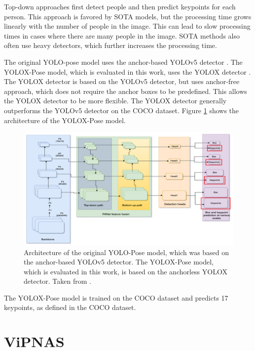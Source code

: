 Top-down approaches first detect people and then predict keypoints for each person. This approach is favored by SOTA models, but the processing time grows linearly with the number of people in the image. This can lead to slow processing times in cases where there are many people in the image. SOTA methods also often use heavy detectors, which further increases the processing time.



The original YOLO-pose \cite{yoloPose} model uses the anchor-based YOLOv5 detector \cite{yolov5}. The YOLOX-Pose model, which is evaluated in this work, uses the YOLOX detector \cite{yolox}. The YOLOX detector is based on the YOLOv5 detector, but uses anchor-free approach, which does not require the anchor boxes to be predefined. This allows the YOLOX detector to be more flexible. The YOLOX detector generally outperforms the YOLOv5 detector on the COCO dataset. Figure \ref{fig:yolopose_architecture} shows the architecture of the YOLOX-Pose model.

\begin{figure}[htbp]
    \centering
    \includegraphics[width=\textwidth]{obrazky-figures/yolopose_architecture.png}
    \caption{Architecture of the original YOLO-Pose model, which was based on the anchor-based YOLOv5 detector. The YOLOX-Pose model, which is evaluated in this work, is based on the anchorless YOLOX detector. Taken from \cite{yoloPose}.}
    \label{fig:yolopose_architecture}
\end{figure}

The YOLOX-Pose model is trained on the COCO dataset and predicts 17 keypoints, as defined in the COCO dataset.

\section{ViPNAS}
\label{vipnas}

